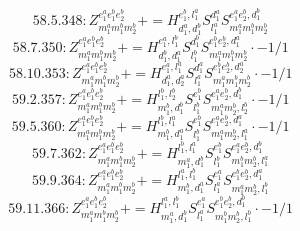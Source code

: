 \documentclass[letterpaper,10pt,fleqn,leqno,onecolumn]{article}
\begin{document}
\begin{equation} \;\;\;\;\;\;  58.5.348: Z^{e_{1}^{a}e_{1}^{b}e_{2}^{b}}_{m_{1}^{a}m_{1}^{b}m_{2}^{b}}+=H^{e_{1}^{b},l_{1}^{a}}_{d_{1}^{a},d_{1}^{b}}S^{d_{1}^{a}}_{l_{1}^{a}}S^{e_{1}^{a}e_{2}^{b},d_{1}^{b}}_{m_{1}^{a}m_{1}^{b}m_{2}^{b}} \end{equation}
\begin{equation} \;\;\;\;\;\;  58.7.350: Z^{e_{1}^{a}e_{1}^{b}e_{2}^{b}}_{m_{1}^{a}m_{1}^{b}m_{2}^{b}}+=H^{e_{1}^{a},l_{1}^{b}}_{d_{1}^{b},d_{1}^{a}}S^{d_{1}^{b}}_{l_{1}^{b}}S^{e_{1}^{b}e_{2}^{b},d_{1}^{a}}_{m_{1}^{a}m_{1}^{b}m_{2}^{b}}\cdot -1/1 \end{equation}
\begin{equation} \;\;\;\;\;\;  58.10.353: Z^{e_{1}^{a}e_{1}^{b}e_{2}^{b}}_{m_{1}^{a}m_{1}^{b}m_{2}^{b}}+=H^{e_{1}^{a},l_{1}^{a}}_{d_{1}^{a},d_{2}^{a}}S^{d_{1}^{a}}_{l_{1}^{a}}S^{e_{1}^{b}e_{2}^{b},d_{2}^{a}}_{m_{1}^{a}m_{1}^{b}m_{2}^{b}}\cdot -1/1 \end{equation}
\begin{equation} \;\;\;\;\;\;  59.2.357: Z^{e_{1}^{a}e_{1}^{b}e_{2}^{b}}_{m_{1}^{a}m_{1}^{b}m_{2}^{b}}+=H^{l_{1}^{b},l_{2}^{b}}_{m_{1}^{b},d_{1}^{b}}S^{e_{1}^{b}}_{l_{1}^{b}}S^{e_{1}^{a}e_{2}^{b},d_{1}^{b}}_{m_{1}^{a}m_{2}^{b},l_{2}^{b}}\cdot -1/1 \end{equation}
\begin{equation} \;\;\;\;\;\;  59.5.360: Z^{e_{1}^{a}e_{1}^{b}e_{2}^{b}}_{m_{1}^{a}m_{1}^{b}m_{2}^{b}}+=H^{l_{1}^{b},l_{1}^{a}}_{m_{1}^{b},d_{1}^{a}}S^{e_{1}^{b}}_{l_{1}^{b}}S^{e_{1}^{a}e_{2}^{b},d_{1}^{a}}_{m_{1}^{a}m_{2}^{b},l_{1}^{a}}\cdot -1/1 \end{equation}
\begin{equation} \;\;\;\;\;\;  59.7.362: Z^{e_{1}^{a}e_{1}^{b}e_{2}^{b}}_{m_{1}^{a}m_{1}^{b}m_{2}^{b}}+=H^{l_{1}^{b},l_{1}^{a}}_{m_{1}^{a},d_{1}^{b}}S^{e_{1}^{b}}_{l_{1}^{b}}S^{e_{1}^{a}e_{2}^{b},d_{1}^{b}}_{m_{1}^{b}m_{2}^{b},l_{1}^{a}} \end{equation}
\begin{equation} \;\;\;\;\;\;  59.9.364: Z^{e_{1}^{a}e_{1}^{b}e_{2}^{b}}_{m_{1}^{a}m_{1}^{b}m_{2}^{b}}+=H^{l_{1}^{a},l_{1}^{b}}_{m_{1}^{b},d_{1}^{a}}S^{e_{1}^{a}}_{l_{1}^{a}}S^{e_{1}^{b}e_{2}^{b},d_{1}^{a}}_{m_{1}^{a}m_{2}^{b},l_{1}^{b}} \end{equation}
\begin{equation} \;\;\;\;\;\;  59.11.366: Z^{e_{1}^{a}e_{1}^{b}e_{2}^{b}}_{m_{1}^{a}m_{1}^{b}m_{2}^{b}}+=H^{l_{1}^{a},l_{1}^{b}}_{m_{1}^{a},d_{1}^{b}}S^{e_{1}^{a}}_{l_{1}^{a}}S^{e_{1}^{b}e_{2}^{b},d_{1}^{b}}_{m_{1}^{b}m_{2}^{b},l_{1}^{b}}\cdot -1/1 \end{equation}
\end{document}

